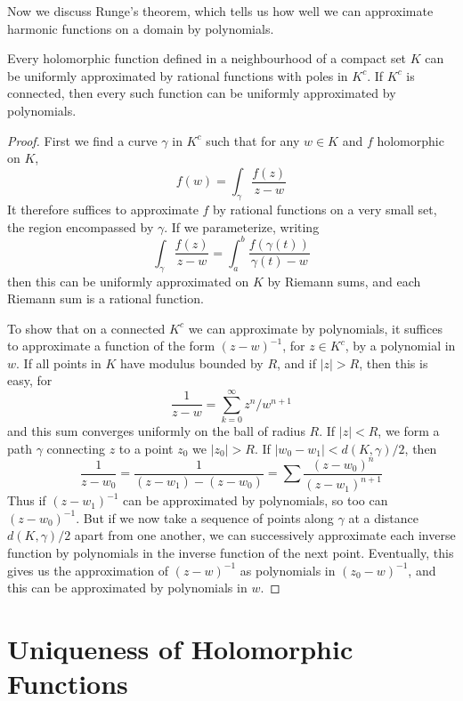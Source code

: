 Now we discuss Runge's theorem, which tells us how well we can approximate harmonic functions on a domain by polynomials.

\begin{theorem}[Runge]
    Every holomorphic function defined in a neighbourhood of a compact set $K$ can be uniformly approximated by rational functions with poles in $K^c$. If $K^c$ is connected, then every such function can be uniformly approximated by polynomials.
\end{theorem}
\begin{proof}
    First we find a curve $\gamma$ in $K^c$ such that for any $w \in K$ and $f$ holomorphic on $K$,
    \[ f(w) = \int_\gamma \frac{f(z)}{z - w} \]
    It therefore suffices to approximate $f$ by rational functions on a very small set, the region encompassed by $\gamma$. If we parameterize, writing
    \[ \int_\gamma \frac{f(z)}{z - w} = \int_a^b \frac{f(\gamma(t))}{\gamma(t) - w} \]
    then this can be uniformly approximated on $K$ by Riemann sums, and each Riemann sum is a rational function.

    To show that on a connected $K^c$ we can approximate by polynomials, it suffices to approximate a function of the form $(z - w)^{-1}$, for $z \in K^c$, by a polynomial in $w$. If all points in $K$ have modulus bounded by $R$, and if $|z| > R$, then this is easy, for
    \[ \frac{1}{z - w} = \sum_{k = 0}^\infty z^n/w^{n+1} \]
    and this sum converges uniformly on the ball of radius $R$. If $|z| < R$, we form a path $\gamma$ connecting $z$ to a point $z_0$ we $|z_0| > R$. If $|w_0 - w_1| < d(K,\gamma)/2$, then
    \[ \frac{1}{z - w_0} = \frac{1}{(z - w_1) - (z - w_0)} = \sum \frac{(z - w_0)^n}{(z - w_1)^{n+1}} \]
    Thus if $(z - w_1)^{-1}$ can be approximated by polynomials, so too can $(z - w_0)^{-1}$. But if we now take a sequence of points along $\gamma$ at a distance $d(K,\gamma)/2$ apart from one another, we can successively approximate each inverse function by polynomials in the inverse function of the next point. Eventually, this gives us the approximation of $(z - w)^{-1}$ as polynomials in $(z_0 - w)^{-1}$, and this can be approximated by polynomials in $w$.
\end{proof}

\section{Uniqueness of Holomorphic Functions}

